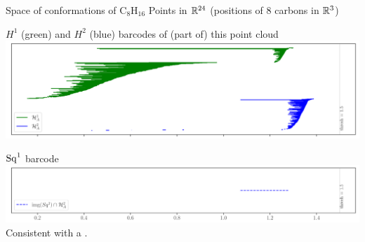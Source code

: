 \begin{frame}{Space of conformations of $\mathrm{C_8H_{16}}$}
	\pause
	Points in $\mathbb{R}^{24}$ (positions of $8$ carbons in $\mathbb{R}^3$)

	\pause\medskip
	$H^1$ (green) and $H^2$ (blue) barcodes of (part of) this point cloud
	\includegraphics[width=\textwidth]{aux/molecule_top.pdf}

	\pause
	$\operatorname{Sq}^1$ barcode
	\includegraphics[width=\textwidth]{aux/molecule_bot.pdf}
	Consistent with a .
\end{frame}